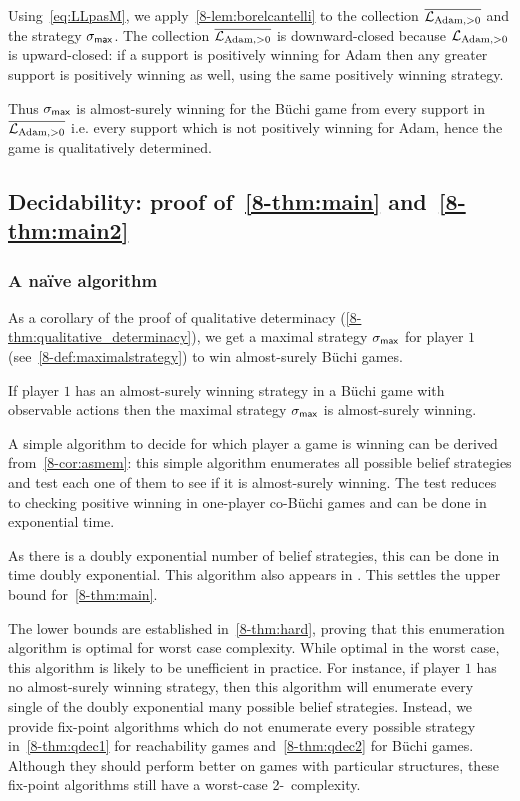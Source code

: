 \medskip


Using~\eqref{eq:LLpasM}, we apply~\cref{8-lem:borelcantelli} to the collection 
$\overline{\mathcal{L}_{\text{Adam},>0}}$ and the strategy $\sigma_{\textsf{max}}$.
The collection $\overline{\mathcal{L}_{\text{Adam},>0}}$ is downward-closed because $\mathcal{L}_{\text{Adam},>0}$ is upward-closed: if a support is positively winning for Adam then any greater support is positively winning as well, using the same positively winning strategy.

Thus $\sigma_{\textsf{max}}$ is almost-surely winning for the B{\"u}chi game from every support in $\overline{\mathcal{L}_{\text{Adam},>0}}$ i.e. every support which is not positively winning for Adam, hence the game is qualitatively determined.

\subsection{Decidability: proof of~\cref{8-thm:main} and~\cref{8-thm:main2}}
\label{8-subsec:proof}

\subsubsection{A na\"ive algorithm}
As a corollary of the proof of qualitative determinacy
(\cref{8-thm:qualitative_determinacy}), we get a maximal strategy $\sigma_{\textsf{max}}$
for player $1$ (see~\cref{8-def:maximalstrategy}) to win
almost-surely B{\"u}chi games.
\begin{corollary}
\label{8-cor:asmem}
  If player $1$ has an almost-surely winning strategy in a B{\"u}chi
  game {with observable actions} then the maximal strategy $\sigma_{\textsf{max}}$ is almost-surely
  winning.
\end{corollary}

A simple algorithm to decide for which player a game is winning can be derived from~\cref{8-cor:asmem}: this simple algorithm enumerates all possible belief strategies
and test each one of them to see if it is almost-surely winning. The test reduces to checking positive winning in one-player co-B{\"u}chi games and can be done in exponential time.

As there is a doubly exponential number of {belief} strategies, this can be done in time doubly exponential. 
This algorithm also appears in \cite{GS-icalp09}.
This settles the upper bound for~\cref{8-thm:main}. 

The lower bounds are established in~\cref{8-thm:hard}, proving that this enumeration algorithm is
  optimal for worst case complexity.  While optimal in the worst case,
  this algorithm is {likely to be unefficient in practice}.  For instance, if player
  $1$ has no almost-surely winning strategy, then this algorithm will
  enumerate every single of the doubly exponential many {possible belief}
  strategies.  Instead, we provide fix-point algorithms which do not
  enumerate every possible strategy in~\cref{8-thm:qdec1} for
  reachability games and~\cref{8-thm:qdec2} for B{\"u}chi games.
  Although they should perform better on games with particular
  structures, these fix-point algorithms still have a worst-case
  2-\EXPTIME\ complexity.


